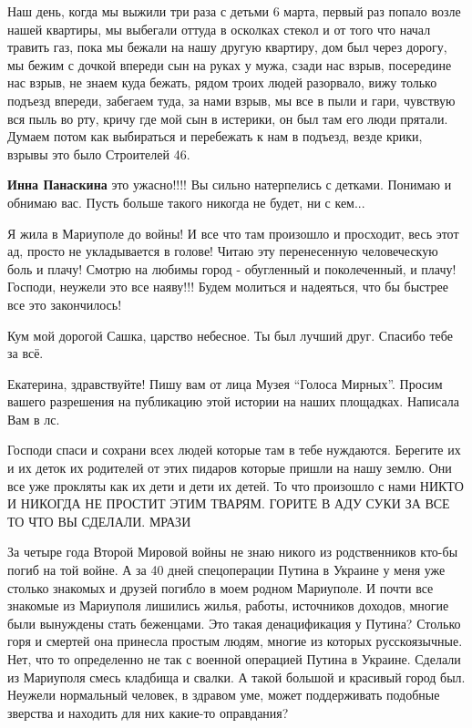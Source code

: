 
Наш день, когда мы выжили три раза с детьми 6 марта, первый раз попало возле
нашей квартиры, мы выбегали оттуда в осколках стекол и от того что начал травить
газ, пока мы бежали на нашу другую квартиру, дом был через дорогу, мы бежим с
дочкой впереди сын на руках у мужа, сзади нас взрыв, посередине нас взрыв, не
знаем куда бежать, рядом троих людей разорвало, вижу только подъезд впереди,
забегаем туда, за нами взрыв, мы все в пыли и гари, чувствую вся пыль во
рту, кричу где мой сын в истерики, он был там его люди прятали. Думаем потом как
выбираться и перебежать к нам в подъезд, везде крики, взрывы это было Строителей
46.

\begin{itemize} %
\textbf{Инна Панаскина} это ужасно!!!! Вы сильно натерпелись с детками. Понимаю и обнимаю вас. Пусть больше такого никогда не будет, ни с кем...
\end{itemize} %


Я жила в Мариуполе до войны! И все что там произошло и просходит, весь этот ад,
просто не укладывается в голове! Читаю эту перенесенную человеческую боль и
плачу! Смотрю на любимы город - обугленный и поколеченный, и плачу! Господи,
неужели это все наяву!!! Будем молиться и надеяться, что бы быстрее все это
закончилось!


Кум мой дорогой Сашка, царство небесное. Ты был лучший друг. Спасибо тебе за всё.


Екатерина, здравствуйте! Пишу вам от лица Музея \enquote{Голоса Мирных}. Просим вашего
разрешения на публикацию этой истории на наших площадках. Написала Вам в лс.


Господи спаси и сохрани всех людей которые там в тебе нуждаются. Берегите их и
их деток их родителей от этих пидаров которые пришли на нашу землю. Они все уже
прокляты как их дети и дети их детей. То что произошло с нами НИКТО И НИКОГДА
НЕ ПРОСТИТ ЭТИМ ТВАРЯМ. ГОРИТЕ В АДУ СУКИ ЗА ВСЕ ТО ЧТО ВЫ СДЕЛАЛИ. МРАЗИ


За четыре года Второй Мировой войны не знаю никого из родственников кто-бы
погиб на той войне. А за 40 дней спецоперации Путина в Украине у меня уже
столько знакомых и друзей погибло в моем родном Мариуполе. И почти все знакомые
из Мариуполя лишились жилья, работы, источников доходов, многие были вынуждены
стать беженцами. Это такая денацификация у Путина? Столько горя и смертей она
принесла простым людям, многие из которых русскоязычные. Нет, что то
определенно не так с военной операцией Путина в Украине. Сделали из Мариуполя
смесь кладбища и свалки. А такой большой и красивый город был. Неужели
нормальный человек, в здравом уме, может поддерживать подобные зверства и
находить для них какие-то оправдания?

